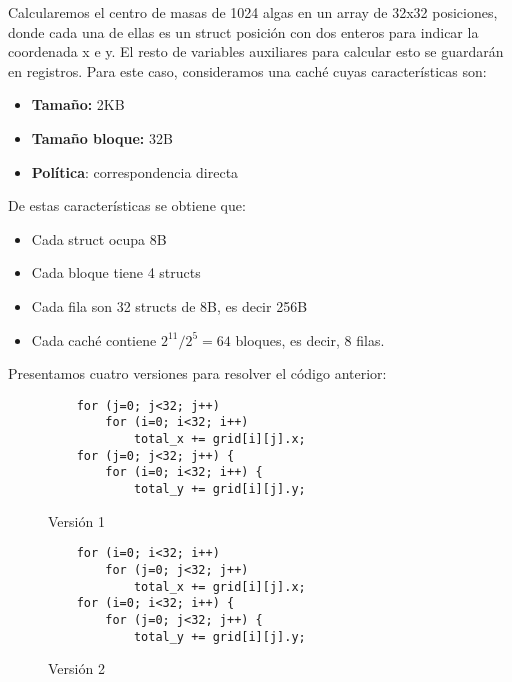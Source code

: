 \begin{ejemplo}
    Calcularemos el centro de masas de 1024 algas en un array de 32x32 posiciones, donde cada una de ellas es un struct posición con dos enteros para indicar
    la coordenada x e y. El resto de variables auxiliares para calcular esto se guardarán en registros. Para este caso, consideramos una caché cuyas características son:   
    \begin{itemize}
        \item \textbf{Tamaño:} 2KB
        \item \textbf{Tamaño bloque:} 32B
        \item \textbf{Política}: correspondencia directa
    \end{itemize}
    De estas características se obtiene que:
    \begin{itemize}
        \item Cada struct ocupa 8B
        \item Cada bloque tiene 4 structs
        \item Cada fila son 32 structs de 8B, es decir 256B
        \item Cada caché contiene $2^{11} / 2^5 = 64$ bloques, es decir, 8 filas.
    \end{itemize}
    Presentamos cuatro versiones para resolver el código anterior:

    \begin{figure}[H]
        \centering
        \begin{minipage}{0.4\textwidth}
            \begin{verbatim}
    for (j=0; j<32; j++)
        for (i=0; i<32; i++)
            total_x += grid[i][j].x;
    for (j=0; j<32; j++) {
        for (i=0; i<32; i++) {
            total_y += grid[i][j].y;
            \end{verbatim}
            \caption{Versión 1}
        \end{minipage}
        \hspace{1cm}
        \begin{minipage}{0.4\textwidth}
            \begin{verbatim}
    for (i=0; i<32; i++)
        for (j=0; j<32; j++)
            total_x += grid[i][j].x;
    for (i=0; i<32; i++) {
        for (j=0; j<32; j++) {
            total_y += grid[i][j].y;
            \end{verbatim}
            \caption{Versión 2}
        \end{minipage}
    \end{figure}


\end{ejemplo}
